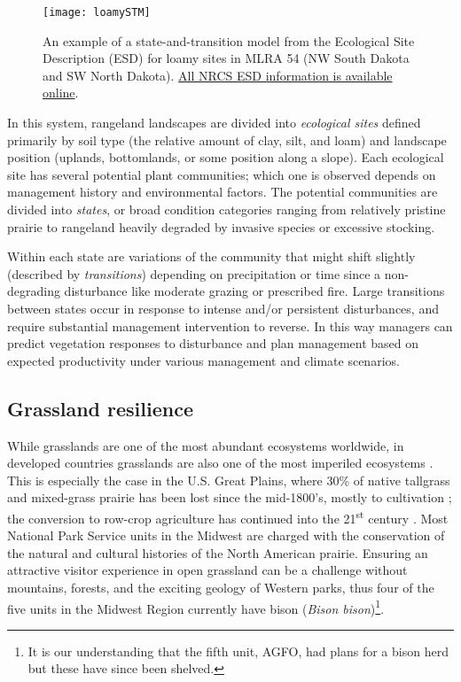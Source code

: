 \begin{figure}[!t]
	\center
	\texttt{[image: loamySTM]}
	\caption[State-and-transition model for loamy sites, MLRA 54]{An example of a state-and-transition model from the Ecological Site Description (ESD) for loamy sites in MLRA 54 (NW South Dakota and SW North Dakota). \href{https://esis.sc.egov.usda.gov/Welcome/pgReportLocation.aspx?type=ESD}{\textcolor{BisonGreen}{All NRCS ESD information is available online}}.}
	\label{fig:STM}
\end{figure}

In this system, rangeland landscapes are divided into \emph{ecological sites} defined primarily by soil type (the relative amount of clay, silt, and loam) and landscape position (uplands, bottomlands, or some position along a slope). 
Each ecological site has several potential plant communities; which one is observed depends on management history and environmental factors. 
The potential communities are divided into \emph{states}, or broad condition categories ranging from relatively pristine prairie to  rangeland heavily degraded by invasive species or excessive stocking. 

Within each state are variations of the community that might shift slightly (described by \emph{transitions}) depending on precipitation or time since a non-degrading disturbance like moderate grazing or prescribed fire. 
Large transitions between states occur in response to intense and/or persistent disturbances, and require substantial management intervention to reverse.
In this way managers can predict vegetation responses to disturbance and plan management based on expected productivity under various management and climate scenarios.

\subsection{Grassland resilience}\label{ssec:resilience}

While grasslands are one of the most abundant ecosystems worldwide, in developed countries grasslands are also one of the most imperiled ecosystems \citep{blair2014, newbold2016}.
This is especially the case in the U.S. Great Plains, where 30\% of native tallgrass and mixed-grass prairie has been lost since the mid-1800's, mostly to cultivation \citep{samson1994}; the conversion to row-crop agriculture has continued into the 21\textsuperscript{st} century \citep{wright2013}. 
Most National Park Service units in the Midwest are charged with the conservation of the natural and cultural histories of the North American prairie.
Ensuring an attractive visitor experience in open grassland can be a challenge without mountains, forests, and the exciting geology of Western parks, thus four of the five units in the Midwest Region currently have bison (\emph{Bison bison})\footnote{
	It is our understanding that the fifth unit, AGFO, had plans for a bison herd but these have since been shelved.}. 

